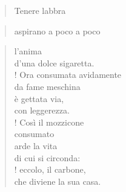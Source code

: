 
\begin{verse}
    Tenere labbra\\
\end{verse}

\vspace{-0.9cm}
\begin{verse}
    aspirano \hfill a poco a poco
\end{verse}
\vspace{-0.9cm}

\begin{verse}
    l'anima\\
    d'una dolce sigaretta.\\!
    Ora consumata avidamente\\
    da fame meschina\\
    è gettata via,\\
    con leggerezza.\\!
    Così il mozzicone\\
    consumato\\
    arde la vita\\
    di cui si circonda:\\!
    eccolo, il carbone,\\
    che diviene la sua casa.
\end{verse}